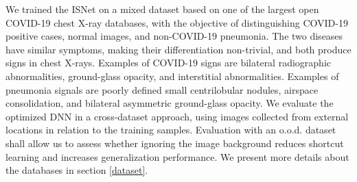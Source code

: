 \documentclass[fleqn,10pt]{wlscirep}
\begin{document}
We trained the ISNet on a mixed dataset based on one of the largest open COVID-19 chest X-ray databases\cite{BrixiaSet}, with the objective of distinguishing COVID-19 positive cases, normal images, and non-COVID-19 pneumonia. The two diseases have similar symptoms, making their differentiation non-trivial, and both produce signs in chest X-rays. Examples of COVID-19 signs are bilateral radiographic abnormalities, ground-glass opacity, and interstitial abnormalities\cite{clinicalCOVID}. Examples of pneumonia signals are poorly defined small centrilobular nodules, airspace consolidation, and bilateral asymmetric ground-glass opacity\cite{clinicalPneumonia}. We evaluate the optimized DNN in a cross-dataset approach, using images collected from external locations in relation to the training samples. Evaluation with an o.o.d. dataset\cite{ShortcutCovid} shall allow us to assess whether ignoring the image background reduces shortcut learning and increases generalization performance. We present more details about the databases in section \ref{dataset}.
\end{document}
